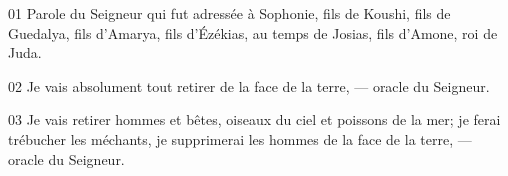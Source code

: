 01 Parole du Seigneur qui fut adressée à Sophonie, fils de Koushi, fils de Guedalya, fils d’Amarya, fils d’Ézékias, au temps de Josias, fils d’Amone, roi de Juda.

02 Je vais absolument tout retirer de la face de la terre, --- oracle du Seigneur.

03 Je vais retirer hommes et bêtes, oiseaux du ciel et poissons de la mer; je ferai trébucher les méchants, je supprimerai les hommes de la face de la terre, --- oracle du Seigneur.
